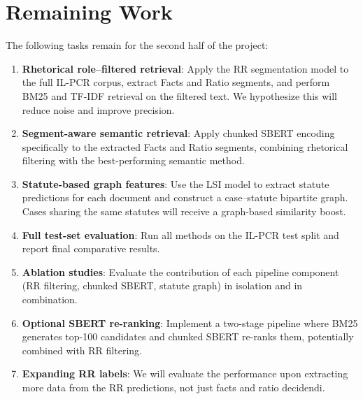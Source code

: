 \documentclass[11pt]{article}
\begin{document}
\section{Remaining Work}

The following tasks remain for the second half of the project:

\begin{enumerate}
    \item \textbf{Rhetorical role--filtered retrieval}: Apply the RR segmentation model to the full IL-PCR corpus, extract Facts and Ratio segments, and perform BM25 and TF-IDF retrieval on the filtered text. We hypothesize this will reduce noise and improve precision.

    \item \textbf{Segment-aware semantic retrieval}: Apply chunked SBERT encoding specifically to the extracted Facts and Ratio segments, combining rhetorical filtering with the best-performing semantic method.

    \item \textbf{Statute-based graph features}: Use the LSI model to extract statute predictions for each document and construct a case--statute bipartite graph. Cases sharing the same statutes will receive a graph-based similarity boost.

    \item \textbf{Full test-set evaluation}: Run all methods on the IL-PCR test split and report final comparative results.

    \item \textbf{Ablation studies}: Evaluate the contribution of each pipeline component (RR filtering, chunked SBERT, statute graph) in isolation and in combination.

    \item \textbf{Optional SBERT re-ranking}: Implement a two-stage pipeline where BM25 generates top-100 candidates and chunked SBERT re-ranks them, potentially combined with RR filtering.
    
    \item \textbf{Expanding RR labels}: We will evaluate the performance upon extracting more data from the RR predictions, not just facts and ratio decidendi.
\end{enumerate}
\end{document}
